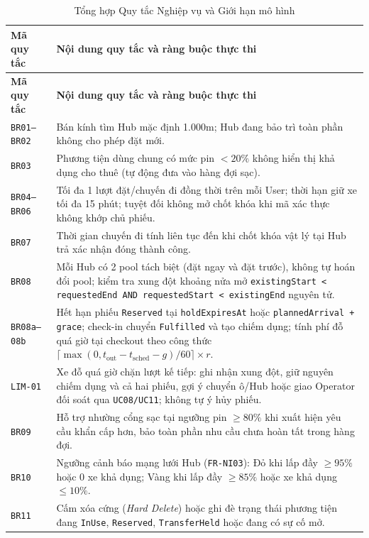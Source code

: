\begin{longtable}{>{\raggedright\arraybackslash}p{2.3cm} >{\raggedright\arraybackslash}p{12.2cm}}
\caption{Tổng hợp Quy tắc Nghiệp vụ và Giới hạn mô hình} \label{tab:business-rules} \\
\toprule
\textbf{Mã quy tắc} & \textbf{Nội dung quy tắc và ràng buộc thực thi} \\
\midrule
\endfirsthead
\toprule
\textbf{Mã quy tắc} & \textbf{Nội dung quy tắc và ràng buộc thực thi} \\
\midrule
\endhead
\bottomrule
\endfoot
\texttt{BR01--BR02} & Bán kính tìm Hub mặc định 1.000m; Hub đang bảo trì toàn phần không cho phép đặt mới. \\
\texttt{BR03} & Phương tiện dùng chung có mức pin $< 20\%$ không hiển thị khả dụng cho thuê (tự động đưa vào hàng đợi sạc). \\
\texttt{BR04--BR06} & Tối đa 1 lượt đặt/chuyến đi đồng thời trên mỗi User; thời hạn giữ xe tối đa 15 phút; tuyệt đối không mở chốt khóa khi mã xác thực không khớp chủ phiếu. \\
\texttt{BR07} & Thời gian chuyến đi tính liên tục đến khi chốt khóa vật lý tại Hub trả xác nhận đóng thành công. \\
\texttt{BR08} & Mỗi Hub có 2 pool tách biệt (đặt ngay và đặt trước), không tự hoán đổi pool; kiểm tra xung đột khoảng nửa mở \texttt{existingStart < requestedEnd AND requestedStart < existingEnd} nguyên tử. \\
\texttt{BR08a--08b} & Hết hạn phiếu \texttt{Reserved} tại \texttt{holdExpiresAt} hoặc \texttt{plannedArrival + grace}; check-in chuyển \texttt{Fulfilled} và tạo chiếm dụng; tính phí đỗ quá giờ tại checkout theo công thức $\lceil \max(0, t_{\text{out}} - t_{\text{sched}} - g) / 60 \rceil \times r$. \\
\texttt{LIM-01} & Xe đỗ quá giờ chặn lượt kế tiếp: ghi nhận xung đột, giữ nguyên chiếm dụng và cả hai phiếu, gợi ý chuyển ô/Hub hoặc giao Operator đối soát qua \texttt{UC08/UC11}; không tự ý hủy phiếu. \\
\texttt{BR09} & Hỗ trợ nhường cổng sạc tại ngưỡng pin $\ge 80\%$ khi xuất hiện yêu cầu khẩn cấp hơn, bảo toàn phần nhu cầu chưa hoàn tất trong hàng đợi. \\
\texttt{BR10} & Ngưỡng cảnh báo mạng lưới Hub (\texttt{FR-NI03}): Đỏ khi lấp đầy $\ge 95\%$ hoặc 0 xe khả dụng; Vàng khi lấp đầy $\ge 85\%$ hoặc xe khả dụng $\le 10\%$. \\
\texttt{BR11} & Cấm xóa cứng (\textit{Hard Delete}) hoặc ghi đè trạng thái phương tiện đang \texttt{InUse}, \texttt{Reserved}, \texttt{TransferHeld} hoặc đang có sự cố mở. \\

\end{longtable}
